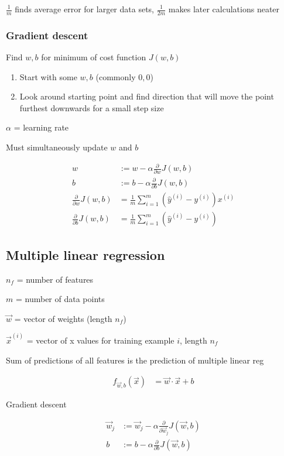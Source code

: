 \documentclass[12pt]{article}
\begin{document}
$\frac{1}{m}$ finds average error for larger data sets, $\frac{1}{2m}$ makes later calculations neater

\subsubsection{Gradient descent}

Find $w,b$ for minimum of cost function $J(w,b)$

\begin{enumerate}
	\item Start with some $w,b$ (commonly $0,0$)
	\item Look around starting point and find direction that will move the point furthest downwards for a small step size
\end{enumerate}

$\alpha$ = learning rate

Must simultaneously update $w$ and $b$

\begin{align*}
    w &:= w - \alpha \frac{\partial}{\partial w} J(w,b)\\
    b &:= b - \alpha \frac{\partial}{\partial b} J(w,b)\\
    \frac{\partial}{\partial w} J(w,b) &= \frac{1}{m} \sum_{i=1}^m ({\hat y}^{(i)} - y^{(i)}) x^{(i)}\\
    \frac{\partial}{\partial b} J(w,b) &= \frac{1}{m} \sum_{i=1}^m ({\hat y}^{(i)} - y^{(i)})
\end{align*}

\subsection{Multiple linear regression}

$n_f$ = number of features

$m$ = number of data points

$\vec{w}$ = vector of weights (length $n_f$)

$\vec{x}^{(i)}$ = vector of x values for training example $i$, length $n_f$

Sum of predictions of all features is the prediction of multiple linear reg

\begin{align*}
    f_{\vec{w},b}(\vec{x}) &= \vec{w} \cdot \vec{x} + b
\end{align*}

Gradient descent

\begin{align*}
    \vec{w}_j &:= \vec{w}_j - \alpha \frac{\partial}{\partial \vec{w}_j} J(\vec{w},b)\\
    b &:= b - \alpha \frac{\partial}{\partial b} J(\vec{w},b)
\end{align*}
\end{document}
